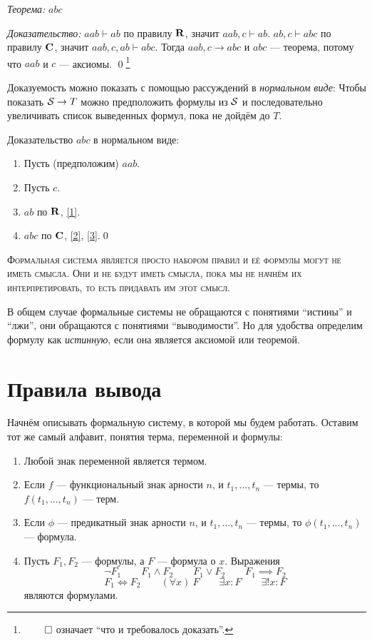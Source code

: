 {\it Теорема:} $abc$

{\it Доказательство:}
$aab\vdash ab$ по правилу $\mathbf{R}$, значит $aab,c\vdash ab$.
$ab,c\vdash abc$ по правилу $\mathbf{C}$, значит $aab,c,ab\vdash abc$.
Тогда $aab,c\to abc$ и $abc$ --- теорема, потому что $aab$ и $c$ --- аксиомы.
\qed\footnote{$\qed$ означает ``что и требовалось доказать''.}

Доказуемость можно показать с помощью рассуждений в {\it нормальном виде}:
Чтобы показать $\mathcal S\to T$ можно предположить формулы из $\mathcal S$ и последовательно
увеличивать список выведенных формул, пока не дойдём до $T$.

\pagebreak

Доказательство $abc$ в нормальном виде:
\begin{enumerate}[label=(\arabic*)]
	\item{}\label{1}Пусть (предположим) $aab$.
	\item{}\label{2}Пусть $c$.
	\item{}\label{3}$ab$ по $\mathbf{R}$, \ref{1}.
	\item{}\label{4}$abc$ по $\mathbf{C}$, \ref{2}, \ref{3}.\qed
\end{enumerate}

\textsc{Формальная система является просто набором правил и её формулы
	могут не иметь смысла. Они и не будут иметь смысла, пока мы не начнём их
	интерпретировать, то есть придавать им этот смысл.}

В общем случае формальные системы не обращаются с понятиями ``истины'' и ``лжи'',
они обращаются с понятиями ``выводимости''. Но для удобства определим формулу
как {\it истинную}, если она является аксиомой или теоремой.

\section{Правила вывода}

Начнём описывать формальную систему, в которой мы будем работать.
Оставим тот же самый алфавит, понятия терма, переменной и формулы:
\begin{fullwidth}
	\begin{multicols}{2}
		\begin{enumerate}
			\item{}Любой знак переменной является термом.
			\item{}Если $f$ --- функциональный знак арности $n$, и $t_1,...,t_{n}$ --- термы,
			то $f(t_1,...,t_{n})$ --- терм.
			\item{}Если $\phi$ --- предикатный знак арности $n$, и $t_1,...,t_{n}$ --- термы,
			то $\phi(t_1,...,t_{n})$ --- формула.

			\columnbreak

			\item{}Пусть $F_1,F_2$ --- формулы, а $F$ --- формула о $x$. Выражения
			\[
				\lnot F_1\qquad F_1\land F_2\qquad F_1\lor F_2\qquad
				F_1\implies F_2
			\]
			\[
				F_1\iff F_2\qquad (\forall x)~F\qquad
				\exists x:F\qquad \exists! x:F
			\]
			являются формулами.
		\end{enumerate}
	\end{multicols}
\end{fullwidth}

